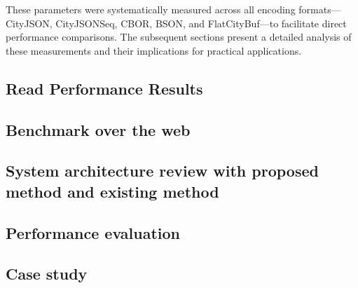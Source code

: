 These parameters were systematically measured across all encoding formats—CityJSON, CityJSONSeq, CBOR, BSON, and FlatCityBuf—to facilitate direct performance comparisons. The subsequent sections present a detailed analysis of these measurements and their implications for practical applications.

\subsection{Read Performance Results}
\label{result:benchmark_on_local_environment:read_performance_results}

\subsection{Benchmark over the web}
\label{result:benchmark_on_local_environment:benchmark_over_the_web}

\subsection{System architecture review with proposed method and existing method}
\label{result:overview:system_architecture_review_with_proposed_method_and_existing_method}

\subsection{Performance evaluation}
\label{result:overview:performance_evaluation}

\subsection{Case study}
\label{result:overview:case_study}
